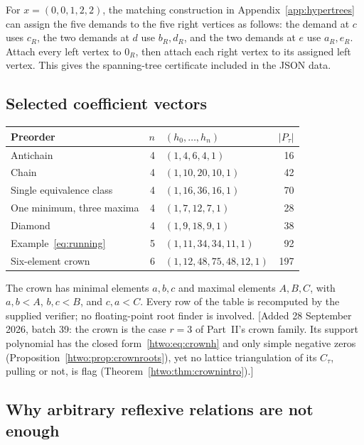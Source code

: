 \documentclass[11pt]{article}
\numberwithin{equation}{section}
\theoremstyle{definition}
\begin{document}
For $x=(0,0,1,2,2)$, the matching construction in
Appendix~\ref{app:hypertrees} can assign the five demands to the five right
vertices as follows: the demand at $c$ uses $c_R$, the two demands at $d$ use
$b_R,d_R$, and the two demands at $e$ use $a_R,e_R$. Attach every left vertex
to $0_R$, then attach each right vertex to its assigned left vertex. This
gives the spanning-tree certificate included in the JSON data.

\subsection{Selected coefficient vectors}

\begin{center}
\begin{tabularx}{\textwidth}{@{}l r Y r@{}}
\toprule
Preorder & $n$ & $(h_0,\ldots,h_n)$ & $|P_\tau|$\\
\midrule
Antichain & 4 & $(1,4,6,4,1)$ & 16\\
Chain & 4 & $(1,10,20,10,1)$ & 42\\
Single equivalence class & 4 & $(1,16,36,16,1)$ & 70\\
One minimum, three maxima & 4 & $(1,7,12,7,1)$ & 28\\
Diamond & 4 & $(1,9,18,9,1)$ & 38\\
Example~\eqref{eq:running} & 5 & $(1,11,34,34,11,1)$ & 92\\
Six-element crown & 6 & $(1,12,48,75,48,12,1)$ & 197\\
\bottomrule
\end{tabularx}
\end{center}
The crown has minimal elements $a,b,c$ and maximal elements $A,B,C$, with
$a,b<A$, $b,c<B$, and $c,a<C$. Every row of the table is recomputed by the
supplied verifier; no floating-point root finder is involved.
[Added 28 September 2026, batch 39: the crown is the case $r=3$ of Part~II's
crown family. Its support polynomial has the closed form~\eqref{htwo:eq:crownh}
and only simple negative zeros (Proposition~\ref{htwo:prop:crownroots}), yet
no lattice triangulation of its $C_\tau$, pulling or not, is flag
(Theorem~\ref{htwo:thm:crownintro}).]

\subsection{Why arbitrary reflexive relations are not enough}
\label{gam:sec:reflexiveex}%
\end{document}
